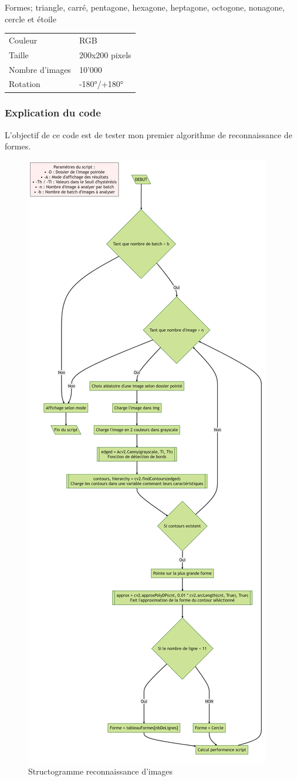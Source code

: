 	Formes; triangle, carré, pentagone, hexagone, heptagone, octogone, nonagone, cercle et étoile
	\begin{center}
		\begin{tabular}{l|l}
			Couleur & RGB \\
			Taille & 200x200 pixels \\
			Nombre d'images & 10'000 \\
			Rotation & -180°/+180° \\
		\end{tabular}	
	\end{center}
	\clearpage
	
	\subsubsection{Explication du code}
	L'objectif de ce code est de tester mon premier algorithme de reconnaissance de formes. 
	
	\begin{figure}[!h]
		\centering
		\includegraphics[height=1.2\textwidth]{../Flowcharts/ShapeDetect_B.png}
		\caption{Structogramme reconnaissance d'images}
		\label{fig:structo1}
	\end{figure}
	
